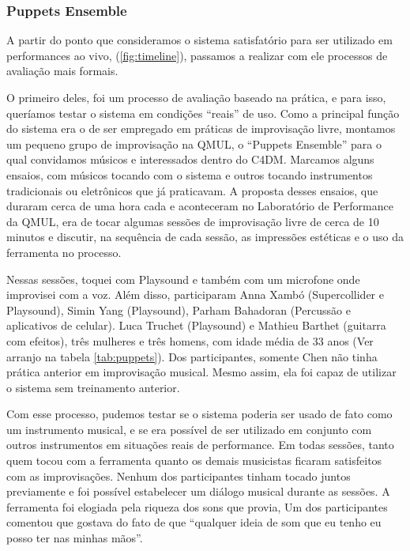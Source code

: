 


\subsubsection{Puppets Ensemble}

A partir do ponto que consideramos o sistema satisfatório para ser utilizado em performances ao vivo, (\ref{fig:timeline}), passamos a realizar com ele processos de avaliação mais formais. 

O primeiro deles, foi um processo de avaliação baseado na prática, e para isso, queríamos testar o sistema em condições ``reais'' de uso. Como a principal função do sistema era o de ser empregado em práticas de improvisação livre, montamos um pequeno grupo de improvisação na QMUL, o ``Puppets Ensemble'' para o qual convidamos músicos e interessados dentro do C4DM. Marcamos alguns ensaios, com músicos tocando com o sistema e outros tocando instrumentos tradicionais ou eletrônicos que já praticavam. A proposta desses ensaios, que duraram cerca de uma hora cada e aconteceram no Laboratório de Performance da QMUL, era de tocar algumas sessões de improvisação livre de cerca de 10 minutos e discutir, na sequência de cada sessão, as impressões estéticas e o uso da ferramenta no processo.

Nessas sessões, toquei com Playsound e também com um microfone onde improvisei com a voz. Além disso, participaram Anna Xambó (Supercollider e Playsound), Simin Yang (Playsound), Parham Bahadoran (Percussão e aplicativos de celular). Luca Truchet (Playsound) e Mathieu Barthet (guitarra com efeitos), três mulheres e três homens, com idade média de 33 anos (Ver arranjo na tabela \ref{tab:puppets}). Dos participantes, somente Chen não tinha prática anterior em improvisação musical. Mesmo assim, ela foi capaz de utilizar o sistema sem treinamento anterior.

Com esse processo, pudemos testar se o sistema poderia ser usado de fato como um instrumento musical, e se era possível de ser utilizado em conjunto com outros instrumentos em situações reais de performance. Em todas sessões, tanto quem tocou com a ferramenta quanto os demais musicistas ficaram satisfeitos com as improvisações. Nenhum dos participantes tinham tocado juntos previamente e foi possível estabelecer um diálogo musical durante as sessões. A ferramenta foi elogiada pela riqueza dos sons que provia, Um dos participantes comentou que gostava do fato de que ``qualquer ideia de som que eu tenho eu posso ter nas minhas mãos''. 

